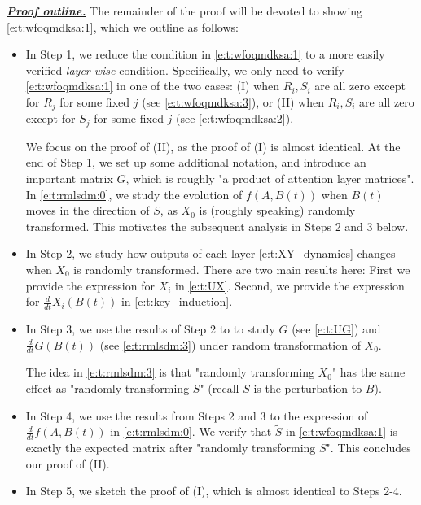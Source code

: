 \documentclass{article}
\newcommand{\emphh}[1]{\textbf{\emph{#1}}}
\begin{document}
\underline{\emphh{Proof outline.}}
The remainder of the proof will be devoted to showing \eqref{e:t:wfoqmdksa:1}, which we outline as follows:
\begin{itemize}[leftmargin=*]
\item In Step 1, we reduce the condition in \eqref{e:t:wfoqmdksa:1} to a more easily verified \emph{layer-wise} condition. Specifically, we only need to verify \eqref{e:t:wfoqmdksa:1} in one of the two cases: (I) when $R_i,S_i$ are all zero except for $R_j$ for some fixed $j$ (see \eqref{e:t:wfoqmdksa:3}), or (II) when $R_i,S_i$ are all zero except for $S_j$ for some fixed $j$ (see \eqref{e:t:wfoqmdksa:2}).

We focus on the proof of (II), as the proof of (I) is almost identical. At the end of Step 1, we set up some additional notation, and introduce an important matrix $G$, which is roughly "a product of attention layer matrices". In \eqref{e:t:rmlsdm:0}, we study the evolution of $f(A,B(t))$ when $B(t)$ moves in the direction of $S$, as $X_0$ is (roughly speaking) randomly transformed. This motivates the subsequent analysis in Steps 2 and 3 below.

\item In Step 2, we study how outputs of each layer \eqref{e:t:XY_dynamics} changes when $X_0$ is randomly transformed. There are two main results here: First we provide the expression for $X_i$ in \eqref{e:t:UX}. Second, we provide the expression for $\frac{d}{dt} X_i(B(t))$ in \eqref{e:t:key_induction}.

\item In Step 3, we use the results of Step 2 to to study $G$ (see \eqref{e:t:UG}) and $\frac{d}{dt} G(B(t))$ (see \eqref{e:t:rmlsdm:3}) under random transformation of $X_0$.

The idea in \eqref{e:t:rmlsdm:3} is that "randomly transforming $X_0$" has the same effect as "randomly transforming $S$" (recall $S$ is the perturbation to $B$). 

\item In Step 4, we use the results from Steps 2 and 3 to the expression of $\frac{d}{dt} f(A, B(t))$ in \eqref{e:t:rmlsdm:0}. We verify that $\tilde{S}$ in \eqref{e:t:wfoqmdksa:1} is exactly the expected matrix after "randomly transforming $S$". This concludes our proof of (II).

\item In Step 5, we sketch the proof of (I), which is almost identical to Steps 2-4. 
\end{itemize}
\end{document}

